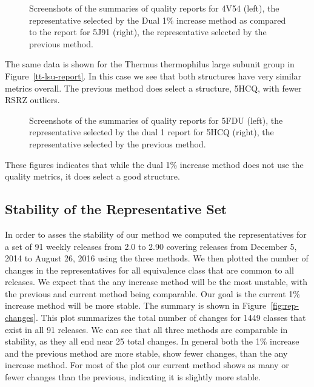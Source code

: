 \begin{figure}
  \caption{Screenshots of the summaries of quality reports for 4V54 (left), the
    representative selected by the Dual 1\% increase method as compared to the
    report for 5J91 (right), the representative selected by the previous
  method.}
  \label{fig:ec-lsu-report}
\end{figure}

The same data is shown for the Thermus thermophilus large subunit group in
Figure~\ref{tt-lsu-report}. In this case we see that both structures have very
similar metrics overall. The previous method does select a structure, 5HCQ, with
fewer RSRZ outliers.

\begin{figure}
  \caption{Screenshots of the summaries of quality reports for 5FDU (left), the
    representative selected by the dual 1%
    report for 5HCQ (right), the representative selected by the previous
  method.}
  \label{fig:tt-lsu-report}
\end{figure}

These figures indicates that while the dual 1\% increase method does not use the
quality metrics, it does select a good structure.

\subsection{Stability of the Representative Set}

In order to asses the stability of our method we computed the representatives
for a set of 91 weekly releases from 2.0 to 2.90 covering releases from December
5, 2014 to August 26, 2016 using the three methods. We then plotted the number
of changes in the representatives for all equivalence class that are common to
all releases. We expect that the any increase method will be the most unstable,
with the previous and current method being comparable. Our goal is the current
1\% increase method will be more stable. The summary is shown in
Figure~\ref{fig:rep-changes}. This plot summarizes the total number of changes
for 1449 classes that exist in all 91 releases. We can see that all three
methods are comparable in stability, as they all end near 25 total changes. In
general both the 1\% increase and the previous method are more stable, show fewer
changes, than the any increase method. For most of the plot our current method
shows as many or fewer changes than the previous, indicating it is slightly more
stable.

